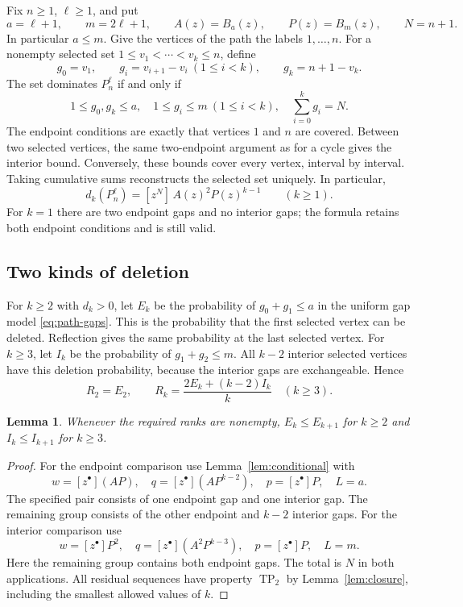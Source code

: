 \documentclass[11pt]{article}
\newtheorem{lemma}[theorem]{Lemma}
\theoremstyle{definition}
\theoremstyle{remark}
\newcommand{\TP}{\operatorname{TP}_2}
\newcommand{\coef}[2]{[z^{#1}]\,#2}
\begin{document}
Fix $n\geq1$, $\ell\geq1$, and put
\[
 a=\ell+1,\qquad m=2\ell+1,\qquad
 A(z)=B_a(z),\qquad P(z)=B_m(z),\qquad N=n+1.
\]
In particular $a\leq m$. Give the vertices of the path the labels
$1,\ldots,n$. For a nonempty selected set
$1\leq v_1<\cdots<v_k\leq n$, define
\[
 g_0=v_1,\qquad g_i=v_{i+1}-v_i\ (1\leq i<k),\qquad
 g_k=n+1-v_k.
\]
The set dominates $P_n^\ell$ if and only if
\begin{equation}\label{eq:path-gaps}
 1\leq g_0,g_k\leq a,\quad
 1\leq g_i\leq m\ (1\leq i<k),\quad
 \sum_{i=0}^{k}g_i=N.
\end{equation}
The endpoint conditions are exactly that vertices $1$ and $n$ are
covered. Between two selected vertices, the same two-endpoint argument
as for a cycle gives the interior bound. Conversely, these bounds cover
every vertex, interval by interval. Taking cumulative sums reconstructs
the selected set uniquely. In particular,
\begin{equation}\label{eq:path-count}
 d_k(P_n^\ell)=\coef{N}{A(z)^2P(z)^{k-1}}\qquad(k\geq1).
\end{equation}
For $k=1$ there are two endpoint gaps and no interior gaps; the formula
retains both endpoint conditions and is still valid.

\subsection{Two kinds of deletion}

For $k\geq2$ with $d_k>0$, let $E_k$ be the probability of
$g_0+g_1\leq a$ in the uniform gap model \eqref{eq:path-gaps}. This is the
probability that the first selected vertex can be deleted. Reflection
gives the same probability at the last selected vertex. For $k\geq3$,
let $I_k$ be the probability of $g_1+g_2\leq m$. All $k-2$ interior
selected vertices have this deletion probability, because the interior
gaps are exchangeable. Hence
\begin{equation}\label{eq:path-R}
 R_2=E_2,\qquad
 R_k=\frac{2E_k+(k-2)I_k}{k}\quad(k\geq3).
\end{equation}

\begin{lemma}\label{lem:EI-monotone}
Whenever the required ranks are nonempty,
$E_k\leq E_{k+1}$ for $k\geq2$ and
$I_k\leq I_{k+1}$ for $k\geq3$.
\end{lemma}

\begin{proof}
For the endpoint comparison use Lemma~\ref{lem:conditional} with
\[
 w=[z^\bullet](AP),\quad q=[z^\bullet](AP^{k-2}),\quad
 p=[z^\bullet]P,\quad L=a.
\]
The specified pair consists of one endpoint gap and one interior gap.
The remaining group consists of the other endpoint and $k-2$ interior
gaps. For the interior comparison use
\[
 w=[z^\bullet]P^2,\quad q=[z^\bullet](A^2P^{k-3}),\quad
 p=[z^\bullet]P,\quad L=m.
\]
Here the remaining group contains both endpoint gaps. The total is $N$
in both applications. All residual sequences have property $\TP$ by
Lemma~\ref{lem:closure}, including the smallest allowed values of $k$.
\end{proof}
\end{document}
